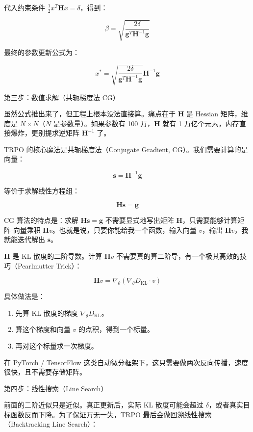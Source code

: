 代入约束条件 \(\frac{1}{2}x^{T}\mathbf{H}x=\delta\)，得到：

\[
\beta=
\sqrt{
\frac{2\delta}{\mathbf{g}^{T}\mathbf{H}^{-1}\mathbf{g}}
}
\]

最终的参数更新公式为：

\[
x^{*}
=
\sqrt{
\frac{2\delta}{\mathbf{g}^{T}\mathbf{H}^{-1}\mathbf{g}}
}
\mathbf{H}^{-1}\mathbf{g}
\]

第三步：数值求解（共轭梯度法 CG）

虽然公式推出来了，但工程上根本没法直接算。痛点在于 \(\mathbf{H}\) 是 Hessian 矩阵，维度是 \(N\times N\)（\(N\) 是参数量）。如果参数有 100 万，\(\mathbf{H}\) 就有 1 万亿个元素，内存直接爆炸，更别提求逆矩阵 \(\mathbf{H}^{-1}\) 了。

TRPO 的核心魔法是共轭梯度法（Conjugate Gradient, CG）。我们需要计算的是向量：

\[
\mathbf{s}=\mathbf{H}^{-1}\mathbf{g}
\]

等价于求解线性方程组：

\[
\mathbf{H}\mathbf{s}=\mathbf{g}
\]

CG 算法的特点是：求解 \(\mathbf{H}\mathbf{s}=\mathbf{g}\) 不需要显式地写出矩阵 \(\mathbf{H}\)，只需要能够计算矩阵-向量乘积 \(\mathbf{H}v\)。也就是说，只要你能给我一个函数，输入向量 \(v\)，输出 \(\mathbf{H}v\)，我就能迭代解出 \(\mathbf{s}\)。

\(\mathbf{H}\) 是 KL 散度的二阶导数。计算 \(\mathbf{H}v\) 不需要真的算二阶导，有一个极其高效的技巧（Pearlmutter Trick）：

\[
\mathbf{H}v
=
\nabla_\theta(\nabla_\theta D_{\mathrm{KL}}\cdot v)
\]

具体做法是：

\begin{enumerate}
\def\labelenumi{\arabic{enumi}.}
\tightlist
\item
  先算 KL 散度的梯度 \(\nabla_\theta D_{\mathrm{KL}}\)。
\item
  算这个梯度和向量 \(v\) 的点积，得到一个标量。
\item
  再对这个标量求一次梯度。
\end{enumerate}

在 PyTorch / TensorFlow 这类自动微分框架下，这只需要做两次反向传播，速度很快，且不需要存储矩阵。

第四步：线性搜索（Line Search）

前面的二阶近似只是近似。真正更新后，实际 KL 散度可能会超过 \(\delta\)，或者真实目标函数反而下降。为了保证万无一失，TRPO 最后会做回溯线性搜索（Backtracking Line Search）：

